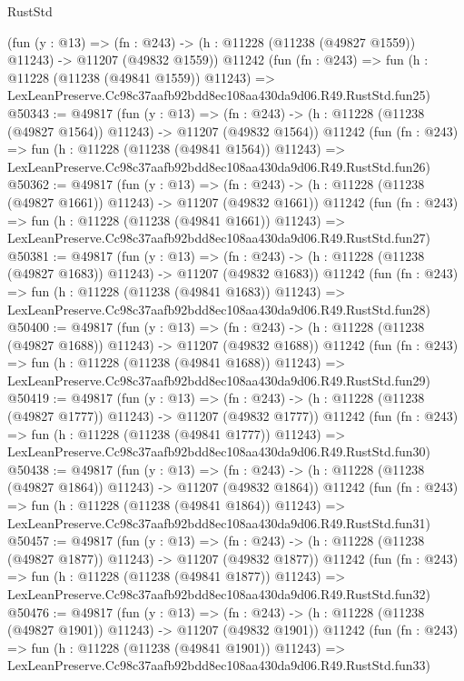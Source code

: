 \begin{lexlean}{RustStd}
\begin{coremodule}
    (fun (y : @13) =>
    (fn : @243) -> (h : @11228 (@11238 (@49827 @1559)) @11243) -> @11207 (@49832 @1559))
    @11242
    (fun (fn : @243) =>
    fun (h : @11228 (@11238 (@49841 @1559)) @11243) =>
    LexLeanPreserve.Cc98c37aafb92bdd8ec108aa430da9d06.R49.RustStd.fun25)
@50343 := @49817
    (fun (y : @13) =>
    (fn : @243) -> (h : @11228 (@11238 (@49827 @1564)) @11243) -> @11207 (@49832 @1564))
    @11242
    (fun (fn : @243) =>
    fun (h : @11228 (@11238 (@49841 @1564)) @11243) =>
    LexLeanPreserve.Cc98c37aafb92bdd8ec108aa430da9d06.R49.RustStd.fun26)
@50362 := @49817
    (fun (y : @13) =>
    (fn : @243) -> (h : @11228 (@11238 (@49827 @1661)) @11243) -> @11207 (@49832 @1661))
    @11242
    (fun (fn : @243) =>
    fun (h : @11228 (@11238 (@49841 @1661)) @11243) =>
    LexLeanPreserve.Cc98c37aafb92bdd8ec108aa430da9d06.R49.RustStd.fun27)
@50381 := @49817
    (fun (y : @13) =>
    (fn : @243) -> (h : @11228 (@11238 (@49827 @1683)) @11243) -> @11207 (@49832 @1683))
    @11242
    (fun (fn : @243) =>
    fun (h : @11228 (@11238 (@49841 @1683)) @11243) =>
    LexLeanPreserve.Cc98c37aafb92bdd8ec108aa430da9d06.R49.RustStd.fun28)
@50400 := @49817
    (fun (y : @13) =>
    (fn : @243) -> (h : @11228 (@11238 (@49827 @1688)) @11243) -> @11207 (@49832 @1688))
    @11242
    (fun (fn : @243) =>
    fun (h : @11228 (@11238 (@49841 @1688)) @11243) =>
    LexLeanPreserve.Cc98c37aafb92bdd8ec108aa430da9d06.R49.RustStd.fun29)
@50419 := @49817
    (fun (y : @13) =>
    (fn : @243) -> (h : @11228 (@11238 (@49827 @1777)) @11243) -> @11207 (@49832 @1777))
    @11242
    (fun (fn : @243) =>
    fun (h : @11228 (@11238 (@49841 @1777)) @11243) =>
    LexLeanPreserve.Cc98c37aafb92bdd8ec108aa430da9d06.R49.RustStd.fun30)
@50438 := @49817
    (fun (y : @13) =>
    (fn : @243) -> (h : @11228 (@11238 (@49827 @1864)) @11243) -> @11207 (@49832 @1864))
    @11242
    (fun (fn : @243) =>
    fun (h : @11228 (@11238 (@49841 @1864)) @11243) =>
    LexLeanPreserve.Cc98c37aafb92bdd8ec108aa430da9d06.R49.RustStd.fun31)
@50457 := @49817
    (fun (y : @13) =>
    (fn : @243) -> (h : @11228 (@11238 (@49827 @1877)) @11243) -> @11207 (@49832 @1877))
    @11242
    (fun (fn : @243) =>
    fun (h : @11228 (@11238 (@49841 @1877)) @11243) =>
    LexLeanPreserve.Cc98c37aafb92bdd8ec108aa430da9d06.R49.RustStd.fun32)
@50476 := @49817
    (fun (y : @13) =>
    (fn : @243) -> (h : @11228 (@11238 (@49827 @1901)) @11243) -> @11207 (@49832 @1901))
    @11242
    (fun (fn : @243) =>
    fun (h : @11228 (@11238 (@49841 @1901)) @11243) =>
    LexLeanPreserve.Cc98c37aafb92bdd8ec108aa430da9d06.R49.RustStd.fun33)

\end{coremodule}
\end{lexlean}
